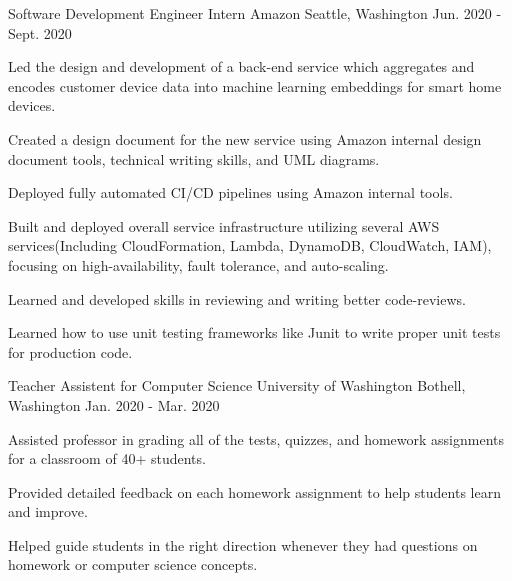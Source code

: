 \begin{cventries}
  \cventry
  {Software Development Engineer Intern} %
  {Amazon} %
  {Seattle, Washington} %
  {Jun. 2020 - Sept. 2020} %
  {
    \begin{cvitems} %
      \item {Led the design and development of a back-end service which aggregates and encodes customer device data into machine learning embeddings for smart home devices.}
      \item {Created a design document for the new service using Amazon internal design document tools, technical writing skills, and UML diagrams.}
      \item {Deployed fully automated CI/CD pipelines using Amazon internal tools.}
      \item {Built and deployed overall service infrastructure utilizing several AWS services(Including CloudFormation, Lambda, DynamoDB, CloudWatch, IAM), focusing on high-availability, fault tolerance, and auto-scaling.}
      \item {Learned and developed skills in reviewing and writing better code-reviews.}
      \item {Learned how to use unit testing frameworks like Junit to write proper unit tests for production code.}
    \end{cvitems}
  }

  \cventry
  {Teacher Assistent for Computer Science} %
  {University of Washington} %
  {Bothell, Washington} %
  {Jan. 2020 - Mar. 2020} %
  {
    \begin{cvitems} %
      \item {Assisted professor in grading all of the tests, quizzes, and homework assignments for a classroom of 40+ students.}
      \item {Provided detailed feedback on each homework assignment to help students learn and improve.}
      \item {Helped guide students in the right direction whenever they had questions on homework or computer science concepts.}
    \end{cvitems}
  }

\end{cventries}

